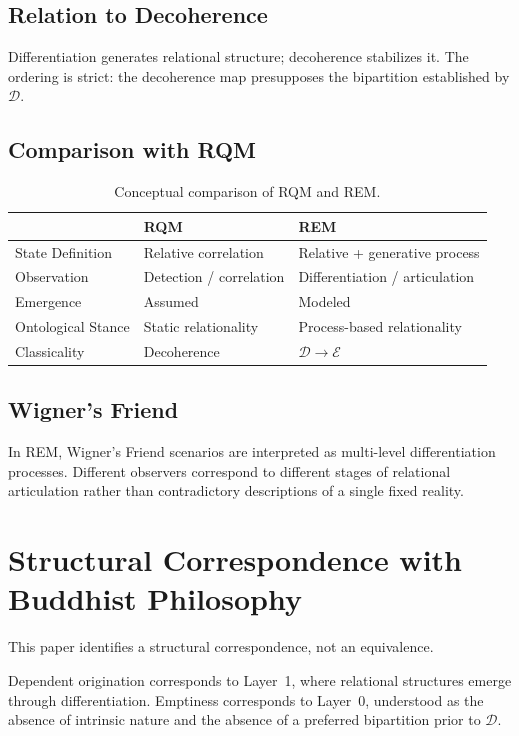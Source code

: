 \documentclass{article}
\begin{document}
\subsection{Relation to Decoherence}
Differentiation generates relational structure; decoherence stabilizes it. The ordering is strict: the decoherence map presupposes the bipartition established by $\mathcal{D}$.

\subsection{Comparison with RQM}
\begin{table}[H]
\centering
\begin{tabular}{lll}
\toprule
 & \textbf{RQM} & \textbf{REM} \\
\midrule
State Definition & Relative correlation & Relative + generative process \\
Observation & Detection / correlation & Differentiation / articulation \\
Emergence & Assumed & Modeled \\
Ontological Stance & Static relationality & Process-based relationality \\
Classicality & Decoherence & $\mathcal{D}\to\mathcal{E}$ \\
\bottomrule
\end{tabular}
\caption{Conceptual comparison of RQM and REM.}
\end{table}

\subsection{Wigner's Friend}
In REM, Wigner's Friend scenarios are interpreted as multi-level differentiation processes. Different observers correspond to different stages of relational articulation rather than contradictory descriptions of a single fixed reality.

\section{Structural Correspondence with Buddhist Philosophy}
This paper identifies a structural correspondence, not an equivalence.

Dependent origination corresponds to Layer~1, where relational structures emerge through differentiation. Emptiness corresponds to Layer~0, understood as the absence of intrinsic nature and the absence of a preferred bipartition prior to $\mathcal{D}$.
\end{document}
